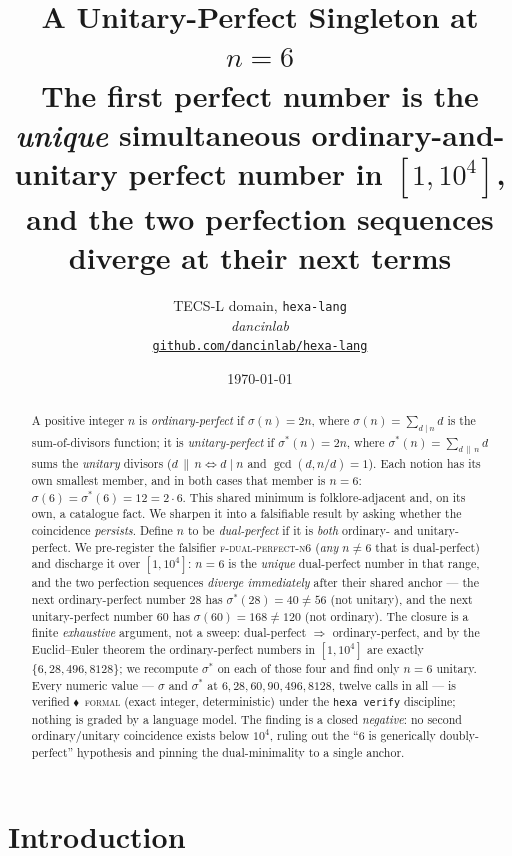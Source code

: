 \documentclass[11pt,a4paper]{article}
\title{
  \textbf{A Unitary-Perfect Singleton at \texorpdfstring{$n=6$}{n=6}}\\[4pt]
  \large The first perfect number is the \emph{unique} simultaneous
  ordinary-and-unitary perfect number in
  \texorpdfstring{$[1,10^4]$}{[1,10000]}, and the two perfection sequences
  diverge at their next terms
}
\author{
  TECS-L domain, \texttt{hexa-lang}\\
  \normalsize\textit{dancinlab}\\[2pt]
  \normalsize\href{https://github.com/dancinlab/hexa-lang}{\texttt{github.com/dancinlab/hexa-lang}}
}
\date{\today}
\newcommand{\sig}{\sigma}
\newcommand{\sigs}{\sigma^{*}}
\newcommand{\formal}{\textcolor{blue!60!black}{$\blacklozenge$}}
\theoremstyle{plain}
\theoremstyle{definition}
\begin{document}
\maketitle

\begin{abstract}
A positive integer $n$ is \emph{ordinary-perfect} if $\sig(n)=2n$, where
$\sig(n)=\sum_{d\mid n}d$ is the sum-of-divisors function; it is
\emph{unitary-perfect} if $\sigs(n)=2n$, where $\sigs(n)=\sum_{d\,\|\,n}d$ sums
the \emph{unitary} divisors ($d\,\|\,n \iff d\mid n$ and $\gcd(d,n/d)=1$). Each
notion has its own smallest member, and in both cases that member is $n=6$:
$\sig(6)=\sigs(6)=12=2\cdot6$. This shared minimum is folklore-adjacent and, on
its own, a catalogue fact. We sharpen it into a falsifiable result by asking
whether the coincidence \emph{persists}. Define $n$ to be \emph{dual-perfect} if
it is \emph{both} ordinary- and unitary-perfect. We pre-register the falsifier
\textsc{f-dual-perfect-n6} (\emph{any} $n\neq6$ that is dual-perfect) and
discharge it over $[1,10^4]$: $n=6$ is the \emph{unique} dual-perfect number in
that range, and the two perfection sequences \emph{diverge immediately} after
their shared anchor --- the next ordinary-perfect number $28$ has $\sigs(28)=40
\neq56$ (not unitary), and the next unitary-perfect number $60$ has $\sig(60)=
168\neq120$ (not ordinary). The closure is a finite \emph{exhaustive} argument,
not a sweep: dual-perfect $\Rightarrow$ ordinary-perfect, and by the
Euclid--Euler theorem the ordinary-perfect numbers in $[1,10^4]$ are exactly
$\{6,28,496,8128\}$; we recompute $\sigs$ on each of those four and find only
$n=6$ unitary. Every numeric value --- $\sig$ and $\sigs$ at
$6,28,60,90,496,8128$, twelve calls in all --- is verified \formal\,
\textsc{formal} (exact integer, deterministic) under the \texttt{hexa verify}
discipline; nothing is graded by a language model. The finding is a closed
\emph{negative}: no second ordinary/unitary coincidence exists below $10^4$,
ruling out the ``$6$ is generically doubly-perfect'' hypothesis and pinning the
dual-minimality to a single anchor.
\end{abstract}

\section{Introduction}
\label{sec:intro}
\end{document}
